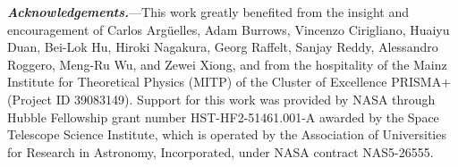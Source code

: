 \documentclass[aps,prl,twocolumn,groupedaddress]{revtex4-2}
\begin{document}
\textbf{\textit{Acknowledgements.}}---This work greatly benefited from the insight and encouragement of Carlos Arg\"{u}elles, Adam Burrows, Vincenzo Cirigliano, Huaiyu Duan, Bei-Lok Hu, Hiroki Nagakura, Georg Raffelt, Sanjay Reddy, Alessandro Roggero, Meng-Ru Wu, and Zewei Xiong, and from the hospitality of the Mainz Institute for Theoretical Physics (MITP) of the Cluster of Excellence PRISMA+ (Project ID 39083149). Support for this work was provided by NASA through Hubble Fellowship grant number HST-HF2-51461.001-A awarded by the Space Telescope Science Institute, which is operated by the Association of Universities for Research in Astronomy, Incorporated, under NASA contract NAS5-26555.







\end{document}

